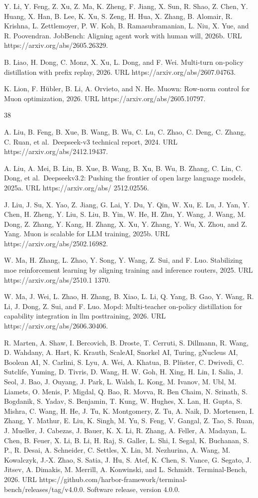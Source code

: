 \documentclass[
  10
]{article}
\begin{document}
Y. Li, Y. Feng, Z. Xu, Z. Ma, K. Zheng, F. Jiang, X. Sun, R. Shao, Z.
Chen, Y. Huang, X. Han, B. Lee, K. Xu, S. Zeng, H. Hua, X. Zhang, B.
Alomair, R. Krishna, L. Zettlemoyer, P. W. Koh, B. Ramasubramanian, L.
Niu, X. Yue, and R. Poovendran. JobBench: Aligning agent work with human
will, 2026b. URL https://arxiv.org/abs/2605.26329.

B. Liao, H. Dong, C. Monz, X. Xu, L. Dong, and F. Wei. Multi-turn
on-policy distillation with prefix replay, 2026. URL
https://arxiv.org/abs/2607.04763.

K. Lion, F. Hübler, B. Li, A. Orvieto, and N. He. Muown: Row-norm
control for Muon optimization, 2026. URL
https://arxiv.org/abs/2605.10797.

38

A. Liu, B. Feng, B. Xue, B. Wang, B. Wu, C. Lu, C. Zhao, C. Deng, C.
Zhang, C. Ruan, et al.~Deepseek-v3 technical report, 2024. URL
https://arxiv.org/abs/2412.19437.

A. Liu, A. Mei, B. Lin, B. Xue, B. Wang, B. Xu, B. Wu, B. Zhang, C. Lin,
C. Dong, et al.~Deepseekv3.2: Pushing the frontier of open large
language models, 2025a. URL https://arxiv.org/abs/ 2512.02556.

J. Liu, J. Su, X. Yao, Z. Jiang, G. Lai, Y. Du, Y. Qin, W. Xu, E. Lu, J.
Yan, Y. Chen, H. Zheng, Y. Liu, S. Liu, B. Yin, W. He, H. Zhu, Y. Wang,
J. Wang, M. Dong, Z. Zhang, Y. Kang, H. Zhang, X. Xu, Y. Zhang, Y. Wu,
X. Zhou, and Z. Yang. Muon is scalable for LLM training, 2025b. URL
https://arxiv.org/abs/2502.16982.

W. Ma, H. Zhang, L. Zhao, Y. Song, Y. Wang, Z. Sui, and F. Luo.
Stabilizing moe reinforcement learning by aligning training and
inference routers, 2025. URL https://arxiv.org/abs/2510.1 1370.

W. Ma, J. Wei, L. Zhao, H. Zhang, B. Xiao, L. Li, Q. Yang, B. Gao, Y.
Wang, R. Li, J. Dong, Z. Sui, and F. Luo. Mopd: Multi-teacher on-policy
distillation for capability integration in llm posttraining, 2026. URL
https://arxiv.org/abs/2606.30406.

R. Marten, A. Shaw, I. Bercovich, B. Droste, T. Cerruti, S. Dillmann, R.
Wang, D. Wahdany, A. Hart, K. Krauth, ScaleAI, Snorkel AI, Turing,
gNucleus AI, Boolean AI, N. Carlini, S. Lyu, A. Wei, A. Khatua, B.
Plüster, C. Dwivedi, C. Sutclife, Yuming, D. Tivris, D. Wang, H. W. Goh,
H. Xing, H. Lin, I. Salia, J. Seol, J. Bao, J. Ouyang, J. Park, L.
Walsh, L. Kong, M. Ivanov, M. Ubl, M. Liamets, O. Menis, P. Migdal, Q.
Bao, R. Movva, R. Ben Chaim, N. Srinath, S. Bogdanik, S. Yadav, S.
Benjamin, T. Kung, W. Hughes, X. Lan, H. Gupta, S. Mishra, C. Wang, H.
He, J. Tu, K. Montgomery, Z. Tu, A. Naik, D. Mortensen, I. Zhang, Y.
Mathur, E. Liu, K. Singh, M. Yu, S. Feng, V. Gangal, Z. Tao, S. Ruan, J.
Mueller, J. Cabezas, J. Bauer, K. X. Li, R. Zhang, A. Feller, A.
Madayan, L. Chen, B. Feuer, X. Li, B. Li, H. Raj, S. Galler, L. Shi, I.
Segal, K. Buchanan, S. P., R. Desai, A. Schneider, C. Settles, X. Lin,
M. Nezhurina, A. Wang, M. Kowalczyk, J.-X. Zhao, S. Satia, J. Hu, S.
Atef, K. Chen, S. Vance, G. Segato, J. Jitsev, A. Dimakis, M. Merrill,
A. Konwinski, and L. Schmidt. Terminal-Bench, 2026. URL
https://github.com/harbor-framework/terminal-bench/releases/tag/v4.0.0.
Software release, version 4.0.0.
\end{document}

